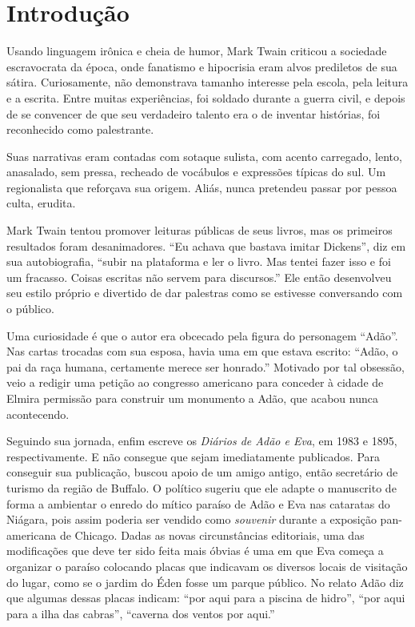 \documentclass[12pt]{extarticle}
\begin{document}
\section{Introdução}

Usando linguagem irônica e cheia de humor, Mark Twain 
criticou a sociedade escravocrata da época, 
onde fanatismo e hipocrisia eram alvos prediletos de sua sátira.
Curiosamente, não demonstrava tamanho interesse pela escola, pela leitura e a escrita.
Entre muitas experiências, foi soldado durante a guerra civil, 
e depois de se convencer de que seu verdadeiro talento era 
o de inventar histórias, foi reconhecido como palestrante.

Suas narrativas eram contadas com sotaque sulista, 
com acento carregado, lento, anasalado, sem pressa, 
recheado de vocábulos e expressões típicas do sul.
Um regionalista que reforçava sua origem.
Aliás, nunca pretendeu passar por pessoa culta, erudita.

Mark Twain tentou promover leituras públicas de seus livros, 
mas os primeiros resultados foram desanimadores. 
``Eu achava que bastava imitar Dickens'', diz em sua autobiografia, 
``subir na plataforma e ler o livro. Mas tentei fazer isso e foi um fracasso. 
Coisas escritas não servem para discursos.'' Ele então desenvolveu seu estilo próprio e 
divertido de dar palestras como se estivesse conversando com o público.

Uma curiosidade é que o autor era obcecado pela figura do personagem ``Adão''. 
Nas cartas trocadas com sua esposa, 
havia uma em que estava escrito: ``Adão, o pai da raça humana, certamente 
merece ser honrado.''
Motivado por tal obsessão, veio a redigir uma petição ao congresso americano 
para conceder à cidade de Elmira permissão para 
construir um monumento a Adão, que acabou nunca acontecendo.

Seguindo sua jornada, enfim escreve os \textit{Diários de Adão e Eva}, 
em 1983 e 1895, respectivamente. E não consegue que sejam imediatamente publicados.
Para conseguir sua publicação, buscou apoio de um amigo antigo, 
então secretário de turismo da região de Buffalo.
O político sugeriu que ele adapte o manuscrito de forma a 
ambientar o enredo do mítico paraíso de Adão e Eva nas cataratas do Niágara, 
pois assim poderia ser vendido como \textit{souvenir} durante a exposição 
pan-americana de Chicago.
Dadas as novas circunstâncias editoriais, uma das modificações que 
deve ter sido feita mais óbvias é uma em que Eva começa a organizar 
o paraíso colocando placas que indicavam os diversos locais de visitação 
do lugar, como se o jardim do Éden fosse um parque público. No relato Adão diz que algumas dessas placas indicam: ``por aqui para 
a piscina de hidro'', ``por aqui para a ilha das cabras'', ``caverna dos ventos por aqui.''
\end{document}
